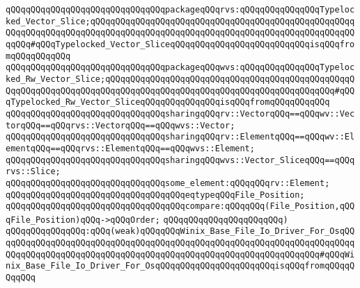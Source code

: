\verb|qQQqqQQqqQQqqQQqqQQqqQQqqQQqqQQqpackageqQQqrvs:qQQqqQQqqQQqqQQqTypelocked_Vector_Slice;qQQqqQQqqQQqqQQqqQQqqQQqqQQqqQQqqQQqqQQqqQQqqQQqqQQqqQQqqQQqqQQqqQQqqQQqqQQqqQQqqQQqqQQqqQQqqQQqqQQqqQQqqQQqqQQqqQQqqQQqqQQqqQQq#qQQqTypelocked_Vector_SliceqQQqqQQqqQQqqQQqqQQqqQQqqQQqisqQQqfromqQQqqQQqqQQq|\newline
\verb|qQQqqQQqqQQqqQQqqQQqqQQqqQQqqQQqpackageqQQqwvs:qQQqqQQqqQQqqQQqTypelocked_Rw_Vector_Slice;qQQqqQQqqQQqqQQqqQQqqQQqqQQqqQQqqQQqqQQqqQQqqQQqqQQqqQQqqQQqqQQqqQQqqQQqqQQqqQQqqQQqqQQqqQQqqQQqqQQqqQQqqQQqqQQqqQQq#qQQqTypelocked_Rw_Vector_SliceqQQqqQQqqQQqqQQqisqQQqfromqQQqqQQqqQQq|\newline
\newline
\verb|qQQqqQQqqQQqqQQqqQQqqQQqqQQqqQQqsharingqQQqrv::VectorqQQq==qQQqwv::VectorqQQq==qQQqrvs::VectorqQQq==qQQqwvs::Vector;|\newline
\newline
\verb|qQQqqQQqqQQqqQQqqQQqqQQqqQQqqQQqsharingqQQqrv::ElementqQQq==qQQqwv::ElementqQQq==qQQqrvs::ElementqQQq==qQQqwvs::Element;|\newline
\newline
\verb|qQQqqQQqqQQqqQQqqQQqqQQqqQQqqQQqsharingqQQqwvs::Vector_SliceqQQq==qQQqrvs::Slice;|\newline
\newline
\verb|qQQqqQQqqQQqqQQqqQQqqQQqqQQqqQQqsome_element:qQQqqQQqrv::Element;|\newline
\newline
\verb|qQQqqQQqqQQqqQQqqQQqqQQqqQQqqQQqqQQqeqtypeqQQqFile_Position;|\newline
\newline
\verb|qQQqqQQqqQQqqQQqqQQqqQQqqQQqqQQqqQQqcompare:qQQqqQQq(File_Position,qQQqFile_Position)qQQq->qQQqOrder;|\newline
\newline
\verb|qQQqqQQqqQQqqQQqqQQqqQQq)|\newline
\newline
\verb|qQQqqQQqqQQqqQQq:qQQq(weak)qQQqqQQqWinix_Base_File_Io_Driver_For_OsqQQqqQQqqQQqqQQqqQQqqQQqqQQqqQQqqQQqqQQqqQQqqQQqqQQqqQQqqQQqqQQqqQQqqQQqqQQqqQQqqQQqqQQqqQQqqQQqqQQqqQQqqQQqqQQqqQQqqQQqqQQqqQQqqQQqqQQq#qQQqWinix_Base_File_Io_Driver_For_OsqQQqqQQqqQQqqQQqqQQqqQQqisqQQqfromqQQqqQQqqQQq|\newline
